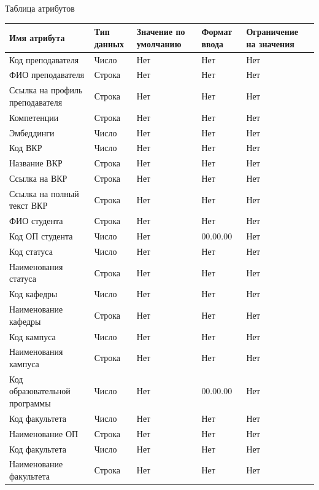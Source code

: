 \documentclass[PI,KR]{HSEUniversity}
\begin{document}
\begin{TABLE}[!h]{Таблица атрибутов \label{tbl:tableDB}}
	\begin{tabular}[c]{|p{4cm}|l|p{3cm}|l|p{3cm}|}
		\hline
		Имя атрибута & Тип данных & Значение по умолчанию & Формат ввода & Ограничение на значения\\ \hline

		Код преподавателя 				& Число  & Нет & Нет 		& Нет \\ \hline
		ФИО преподавателя 				& Строка & Нет & Нет 		& Нет \\ \hline	
		Ссылка на профиль преподавателя & Строка & Нет & Нет 		& Нет \\ \hline
		Компетенции 					& Строка & Нет & Нет 		& Нет \\ \hline
		Эмбеддинги 						& Число  & Нет & Нет 		& Нет \\ \hline
		Код ВКР 						& Число  & Нет & Нет 		& Нет \\ \hline
		Название ВКР 					& Строка & Нет & Нет 		& Нет \\ \hline
		Ссылка на ВКР 					& Строка & Нет & Нет 		& Нет \\ \hline
		Ссылка на полный текст ВКР 		& Строка & Нет & Нет 		& Нет \\ \hline
		ФИО студента 					& Строка & Нет & Нет 		& Нет \\ \hline
		Код ОП студента 				& Число  & Нет & 00.00.00	& Нет \\ \hline
		Код статуса 					& Число  & Нет & Нет		& Нет \\ \hline
		Наименования статуса 			& Строка & Нет & Нет 		& Нет \\ \hline
		Код кафедры 					& Число  & Нет & Нет 		& Нет \\ \hline
		Наименование кафедры 			& Строка & Нет & Нет 		& Нет \\ \hline
		Код кампуса 					& Число  & Нет & Нет 		& Нет \\ \hline
		Наименования кампуса 			& Строка & Нет & Нет 		& Нет \\ \hline
		Код образовательной программы 	& Число  & Нет & 00.00.00 	& Нет \\ \hline
		Код факультета		 			& Число  & Нет & Нет 		& Нет \\ \hline
		Наименование ОП 				& Строка & Нет & Нет	 	& Нет \\ \hline
		Код факультета 					& Число  & Нет & Нет 		& Нет \\ \hline
		Наименование факультета 		& Строка & Нет & Нет 		& Нет \\ \hline
	\end{tabular}
\end{TABLE}
\end{document}
